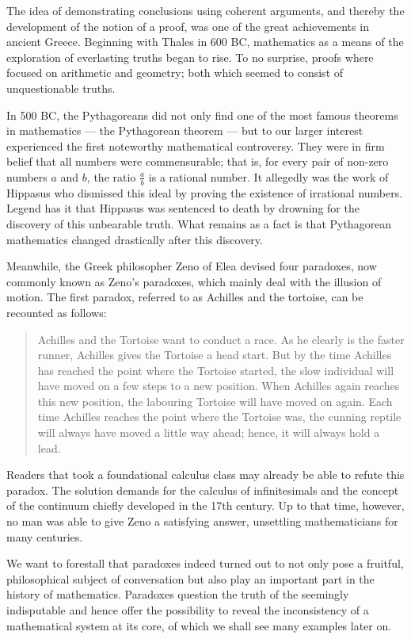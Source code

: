\documentclass[hidelinks]{article}
\begin{document}
The idea of demonstrating conclusions using coherent arguments, and thereby the development of the notion of a proof, was one of the great achievements in ancient Greece.
Beginning with Thales in 600 BC, mathematics as a means of the exploration of everlasting truths began to rise. To no surprise, proofs where focused on arithmetic and geometry; both which seemed to consist of unquestionable truths.

In 500 BC, the Pythagoreans did not only find one of the most famous theorems in mathematics --- the Pythagorean theorem --- but to our larger interest experienced the first noteworthy mathematical controversy. They were in firm belief that all numbers were commensurable; that is, for every pair of non-zero numbers $a$ and $b$, the ratio $\frac{a}{b}$ is a rational number. It allegedly was the work of Hippasus who dismissed this ideal by proving the existence of irrational numbers. Legend has it that Hippasus was sentenced to death by drowning for the discovery of this unbearable truth. What remains as a fact is that Pythagorean mathematics changed drastically after this discovery.

Meanwhile, the Greek philosopher Zeno of Elea devised four paradoxes, now commonly known as Zeno's paradoxes, which mainly deal with the illusion of motion. The first paradox, referred to as Achilles and the tortoise, can be recounted as follows:
\begin{quote}\label{zeno_paradox}
Achilles and the Tortoise want to conduct a race. As he clearly is the faster runner, Achilles gives the Tortoise a head start. But by the time Achilles has reached the point where the Tortoise started, the slow individual will have moved on a few steps to a new position. When Achilles again reaches this new position, the labouring Tortoise will have moved on again. Each time Achilles reaches the point where the Tortoise was, the cunning reptile will always have moved a little way ahead; hence, it will always hold a lead.
\end{quote}
Readers that took a foundational calculus class may already be able to refute this paradox. The solution demands for the calculus of infinitesimals and the concept of the continuum chiefly developed in the 17th century. Up to that time, however, no man was able to give Zeno a satisfying answer, unsettling mathematicians for many centuries.

We want to forestall that paradoxes indeed turned out to not only pose a fruitful, philosophical subject of conversation but also play an important part in the history of mathematics. Paradoxes question the truth of the seemingly indisputable and hence offer the possibility to reveal the inconsistency of a mathematical system at its core, of which we shall see many examples later on.
\end{document}
